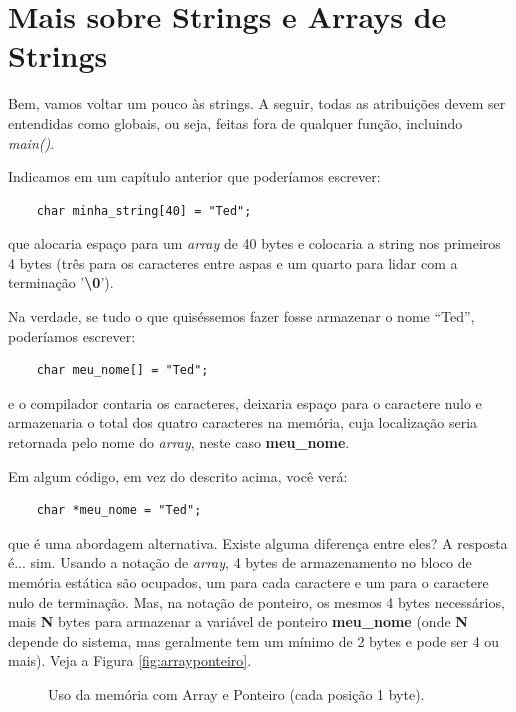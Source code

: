 
\chapter{Mais sobre Strings e Arrays de Strings}
Bem, vamos voltar um pouco às strings. A seguir, todas as atribuições devem ser entendidas como globais, ou seja, feitas fora de qualquer função, incluindo \textit{main()}.

Indicamos em um capítulo anterior que poderíamos escrever:
\begin{lstlisting}
	char minha_string[40] = "Ted";
\end{lstlisting}
que alocaria espaço para um \textit{array} de 40 bytes e colocaria a string nos primeiros 4 bytes (três para os caracteres entre aspas e um quarto para lidar com a terminação '\textbf{\textbackslash0}').

Na verdade, se tudo o que quiséssemos fazer fosse armazenar o nome ``Ted'', poderíamos escrever:
\begin{lstlisting}
	char meu_nome[] = "Ted";
\end{lstlisting}
e o compilador contaria os caracteres, deixaria espaço para o caractere nulo e armazenaria o total dos quatro caracteres na memória, cuja localização seria retornada pelo nome do \textit{array}, neste caso \textbf{meu\_nome}.

Em algum código, em vez do descrito acima, você verá:
\begin{lstlisting}
	char *meu_nome = "Ted";
\end{lstlisting}
que é uma abordagem alternativa. Existe alguma diferença entre eles? A resposta é... sim. Usando a notação de \textit{array}, 4 bytes de armazenamento no bloco de memória estática são ocupados, um para cada caractere e um para o caractere nulo de terminação. Mas, na notação de ponteiro, os mesmos 4 bytes necessários, mais \textbf{N} bytes para armazenar a variável de ponteiro \textbf{meu\_nome} (onde \textbf{N} depende do sistema, mas geralmente tem um mínimo de 2 bytes e pode ser 4 ou mais). Veja a Figura \ref{fig:arrayponteiro}.

\begin{figure}[ht]
	\begin{center}
		
		\caption{Uso da memória com Array e Ponteiro (cada posição 1 byte).}
		\label{fig:arrayponteiro}
	\end{center}
	\label{enderecos}
\end{figure}

